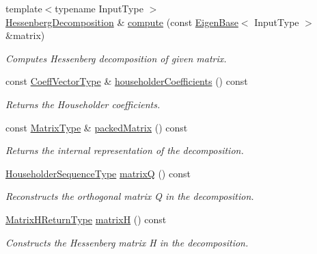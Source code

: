 \begin{DoxyCompactItemize}
{\footnotesize template$<$typename Input\+Type $>$ }\\\hyperlink{group___eigenvalues___module_class_eigen_1_1_hessenberg_decomposition}{Hessenberg\+Decomposition} \& \hyperlink{group___eigenvalues___module_a239a6fd42c57aab3c0b048c47fde3004}{compute} (const \hyperlink{group___core___module_struct_eigen_1_1_eigen_base}{Eigen\+Base}$<$ Input\+Type $>$ \&matrix)
\begin{DoxyCompactList}\small\item\em Computes Hessenberg decomposition of given matrix. \end{DoxyCompactList}\item 
const \hyperlink{group___eigenvalues___module_a567f99f3770365777b67bf9832b6fac1}{Coeff\+Vector\+Type} \& \hyperlink{group___eigenvalues___module_a65fa81ce79d956baa59a30a6d82f8a84}{householder\+Coefficients} () const
\begin{DoxyCompactList}\small\item\em Returns the Householder coefficients. \end{DoxyCompactList}\item 
const \hyperlink{group___eigenvalues___module_a93a611350a7db9d1da18f2c828ecea9f}{Matrix\+Type} \& \hyperlink{group___eigenvalues___module_a1f72b7612fd4edc5a6f31005e433e1dd}{packed\+Matrix} () const
\begin{DoxyCompactList}\small\item\em Returns the internal representation of the decomposition. \end{DoxyCompactList}\item 
\hyperlink{group___eigenvalues___module_a7c1188cd5d8f550c8941df75a50a7d08}{Householder\+Sequence\+Type} \hyperlink{group___eigenvalues___module_a346441e4902a58d43d698ac3da6ff791}{matrixQ} () const
\begin{DoxyCompactList}\small\item\em Reconstructs the orthogonal matrix Q in the decomposition. \end{DoxyCompactList}\item 
\hyperlink{group___eigenvalues___module_struct_eigen_1_1internal_1_1_hessenberg_decomposition_matrix_h_return_type}{Matrix\+H\+Return\+Type} \hyperlink{group___eigenvalues___module_a8e781d2e22a2304647bcf0ae913cc8ea}{matrixH} () const
\begin{DoxyCompactList}\small\item\em Constructs the Hessenberg matrix H in the decomposition. \end{DoxyCompactList}\end{DoxyCompactItemize}
